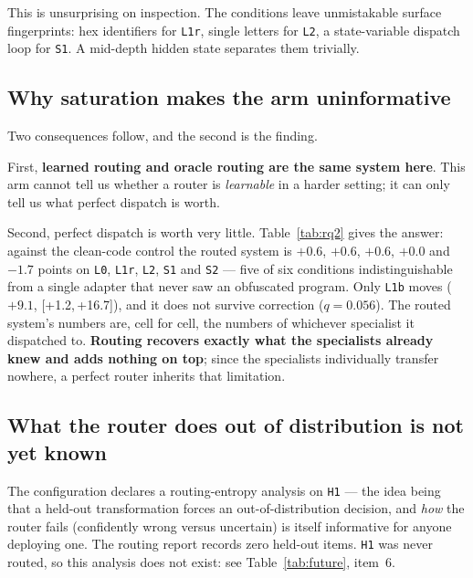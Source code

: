 \documentclass[sigconf,review,anonymous]{acmart}
\newcommand{\cond}[1]{\texttt{#1}}
\newcommand{\ci}[2]{{\small[#1,\,#2]}}
\begin{document}
This is unsurprising on inspection. The conditions leave unmistakable surface fingerprints:
hex identifiers for \cond{L1r}, single letters for \cond{L2}, a state-variable dispatch loop for
\cond{S1}. A mid-depth hidden state separates them trivially.

\subsection{Why saturation makes the arm uninformative}

Two consequences follow, and the second is the finding.

First, \textbf{learned routing and oracle routing are the same system here}. This arm cannot
tell us whether a router is \emph{learnable} in a harder setting; it can only tell us what
perfect dispatch is worth.

Second, perfect dispatch is worth very little. Table~\ref{tab:rq2} gives the answer: against the
clean-code control the routed system is $+0.6$, $+0.6$, $+0.6$, $+0.0$ and $-1.7$ points on
\cond{L0}, \cond{L1r}, \cond{L2}, \cond{S1} and \cond{S2} --- five of six conditions
indistinguishable from a single adapter that never saw an obfuscated program. Only \cond{L1b}
moves ($+9.1$, \ci{+1.2}{+16.7}), and it does not survive correction ($q=0.056$). The routed
system's numbers are, cell for cell, the numbers of whichever specialist it dispatched to.
\textbf{Routing recovers exactly what the specialists already knew and adds nothing on top};
since the specialists individually transfer nowhere, a perfect router inherits that limitation.

\subsection{What the router does out of distribution is not yet known}

The configuration declares a routing-entropy analysis on \cond{H1} --- the idea being that a
held-out transformation forces an out-of-distribution decision, and \emph{how} the router fails
(confidently wrong versus uncertain) is itself informative for anyone deploying one. The routing
report records zero held-out items. \cond{H1} was never routed, so this analysis does not exist:
see Table~\ref{tab:future}, item~6.
\end{document}
